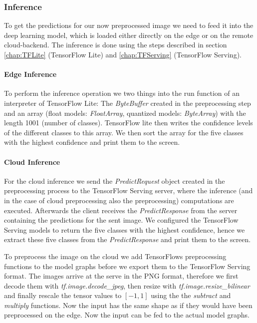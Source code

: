 \subsubsection{Inference}
To get the predictions for our now preprocessed image we need to feed it into the deep learning model, which is loaded either directly on the edge or on the remote cloud-backend. 
The inference is done using the steps described in section \ref{chap:TFLite} (TensorFlow Lite) and \ref{chap:TFServing} (TensorFlow Serving).
\paragraph{Edge Inference}
To perform the inference operation we two things into the run function of an interpreter of TensorFlow Lite: The \emph{ByteBuffer} created in the preprocessing step and an array (float models: \emph{FloatArray}, quantized models: \emph{ByteArray}) with the length 1001 (number of classes). TensorFlow lite then writes the confidence levels of the different classes to this array. We then sort the array for the five classes with the highest confidence and print them to the screen.

\paragraph{Cloud Inference}

For the cloud inference we send the \emph{PredictRequest} object created in the preprocessing process to the TensorFlow Serving server, where the inference (and in the case of cloud preprocessing also the preprocessing) computations are executed. Afterwards the client receives the \emph{PredictResponse} from the server containing the predictions for the sent image. We configured the TensorFlow Serving models to return the five classes with the highest confidence, hence we extract these five classes from the \emph{PredictResponse} and print them to the screen.

To preprocess the image on the cloud we add TensorFlows preprocessing functions to the model graphs before we export them to the TensorFlow Serving format. The images arrive at the serve in the PNG format, therefore we first decode them with \emph{tf.image.decode\_jpeg}, then resize with \emph{tf.image.resize\_bilinear} and finally rescale the tensor values to $[-1,1]$ using the the \emph{subtract} and \emph{multiply} functions. Now the input has the same shape as if they would have been preprocessed on the edge. Now the input can be fed to the actual model graphs.
